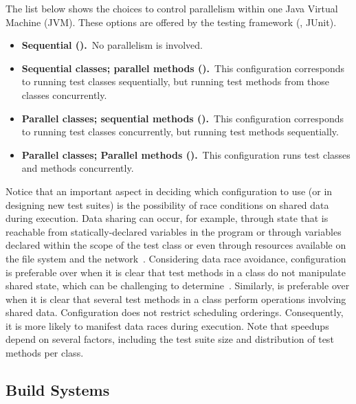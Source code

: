 \documentclass[10pt,journal,compsoc]{IEEEtran}
\begin{document}
The list below shows the choices to control parallelism within one
Java Virtual Machine (JVM).  These options are offered by the testing
framework (\eg{}, JUnit).

\begin{itemize}
\item
    \textbf{Sequential (\Seq).}~No parallelism is involved.
\item
    \textbf{Sequential classes; parallel methods
      (\SeqClassParMeth).}~This configuration corresponds to running
    test classes sequentially, but running test methods from those
    classes concurrently.
\item
    \textbf{Parallel classes; sequential methods
      (\ParClassSeqMeth{}).}~This configuration corresponds to running
    test classes concurrently, but running test methods sequentially.
\item
    \textbf{Parallel classes; Parallel methods
      (\ParClassParMeth).}~This configuration runs test classes and
    methods concurrently.
\end{itemize}

Notice that an important aspect in deciding which configuration to use (or in
designing new test suites) is the possibility of race conditions on shared data
during execution.  Data sharing can occur, for example, through state that is
reachable from statically-declared variables in the program or through variables
declared within the scope of the test class or even through resources available
on the file system and the network~\cite{luo-etal-fse2014}.  Considering data
race avoidance, configuration \SeqClassParMeth{} is preferable over
\ParClassSeqMeth{} when it is clear that test methods in a class do not
manipulate shared state, which can be challenging to
determine~\cite{bell-etal-esecfse2015}.  Similarly, \ParClassSeqMeth{} is
preferable over \SeqClassParMeth{} when it is clear that several test methods in
a class perform operations involving shared data.  Configuration
\ParClassParMeth{} does not restrict scheduling orderings.  Consequently, it is
more likely to manifest data races during execution. Note that speedups depend
on several factors, including the test suite size and distribution of test
methods per class.

\subsection{Build Systems}
\label{sec:builder}
\end{document}
